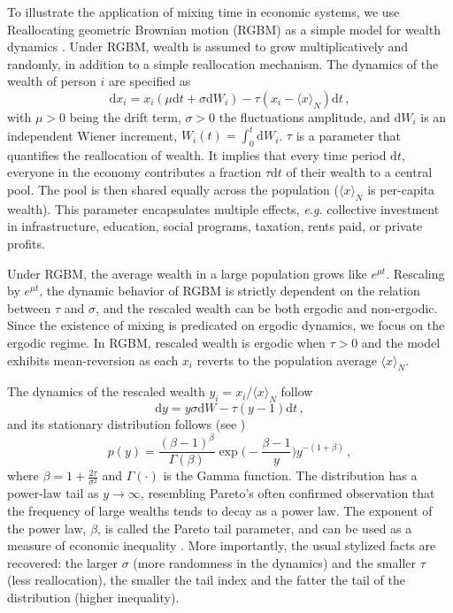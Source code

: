 \documentclass[11pt]{article}
\newcommand{\eg}{{\it e.g.}\xspace}
\newcommand{\be}{\begin{equation}}
\newcommand{\ee}{\end{equation}}
\numberwithin{equation}{section}
\begin{document}
To illustrate the application of mixing time in economic systems, we use Reallocating geometric Brownian motion (RGBM) as a simple model for wealth dynamics \citep{BermanPetersAdamou2019}. Under RGBM, wealth is assumed to grow multiplicatively and randomly, in addition to a simple reallocation mechanism. The dynamics of the wealth of person $i$ are specified as
%
\be
\mathrm{d} x_i = x_i \left( \mu \mathrm{d}t + \sigma \mathrm{d}W_i \right) - \tau \left( x_i - \langle x \rangle_N \right) \mathrm{d}t\,,
\label{eq:rgbm}
\ee
%
with $\mu > 0$ being the drift term, $\sigma > 0$ the fluctuations amplitude, and $\mathrm{d}W_i$ is an independent Wiener increment, $W_i(t) =\int_0^t \mathrm{d}W_i$. $\tau$ is a parameter that quantifies the reallocation of wealth. It implies that every time period $\mathrm{d}t$, everyone in the economy contributes a fraction $\tau\mathrm{d}t$ of their wealth to a central pool. The pool is then shared equally across the population ($\langle x \rangle_N$ is per-capita wealth). This parameter encapsulates multiple effects, \eg collective investment in infrastructure, education, social programs, taxation, rents paid, or private profits.

Under RGBM, the average wealth in a large population grows like $e^{\mu t}$. Rescaling by $e^{\mu t}$, the dynamic behavior of RGBM is strictly dependent on the relation between $\tau$ and $\sigma$, and the rescaled wealth can be both ergodic and non-ergodic. Since the existence of mixing is predicated on ergodic dynamics, we focus on the ergodic regime.  In RGBM, rescaled wealth is ergodic when $\tau > 0$
and the model exhibits mean-reversion as each $x_i$ reverts to the population average $\langle x \rangle_N$.

The dynamics of the rescaled wealth $y_i = x_i / \langle x \rangle_N$ follow
%
\be
    \mathrm{d} y =   y \sigma  \mathrm{d} W - \tau (y - 1)  \mathrm{d}t\,,
    \label{eq:rescaled-rgbm}
\ee
%
and its stationary distribution follows (see \citep{BermanPetersAdamou2019})
%
\be
p(y) = \frac{(\beta - 1)^{\beta}}{\Gamma(\beta)} \exp{\big(-\frac{\beta - 1}{y}\big)} y^{-(1+\beta)}\,,
\label{eq:rgbm-stationary-distribution}
\ee
%
where $\beta = 1 + \frac{2 \tau}{\sigma^2}$ and $\Gamma(\cdot)$ is the Gamma function. The distribution has a power-law tail as $y \to \infty$, resembling Pareto's often confirmed observation that the frequency of large wealths tends to decay as a power law. The exponent of the power law, $\beta$, is called the Pareto tail parameter, and can be used as a measure of economic inequality \citep{Cowell2011}. More importantly, the usual stylized facts are recovered: the larger $\sigma$ (more randomness in the dynamics) and the smaller $\tau$ (less reallocation), the smaller the tail index and the fatter the tail of the distribution (higher inequality).
\end{document}
